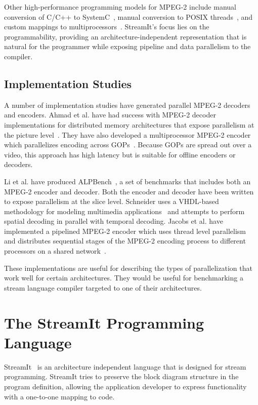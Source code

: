 Other high-performance programming models for MPEG-2 include manual
conversion of C/C++ to SystemC~\cite{pazos04soc}, manual conversion to
POSIX threads~\cite{li05alpbench}, and custom mappings to
multiprocessors~\cite{ahmadmpeg2encoder3, iwata98coarse}.
StreamIt's focus lies on the programmability, providing an
architecture-independent representation that is natural for the
programmer while exposing pipeline and data parallelism to the
compiler.

\section{Implementation Studies}

A number of implementation studies have generated
parallel MPEG-2 decoders and encoders. Ahmad et al. have had
success with MPEG-2 decoder implementations for distributed 
memory architectures that expose parallelism at the
picture level~\cite{ahmadmpeg2encoder, ahmadmpeg2encoder2}. 
They have also developed a multiprocessor MPEG-2 encoder
which parallelizes encoding across GOPs~\cite{ahmadmpeg2encoder3}. 
Because GOPs are spread out over a video, this approach 
has high latency but is suitable for offline encoders or decoders.

Li et al. have produced ALPBench~\cite{li05alpbench}, a set of benchmarks 
that includes both an MPEG-2 encoder and decoder. Both the encoder
and decoder have been written to expose parallelism at the slice level. 
Schneider uses a VHDL-based methodology for modeling multimedia 
applications~\cite{schneider99spec} and attempts to perform spatial 
decoding in parallel with temporal decoding. 
Jacobs et al. have implemented a
pipelined MPEG-2 encoder which uses thread level parallelism and
distributes sequential stages of the MPEG-2 encoding process to 
different processors on a shared network~\cite{jacobs2005mpeg}.

These implementations are useful for describing the types of 
parallelization that work well for certain architectures.
They would be useful for benchmarking a stream language 
compiler targeted to one of their architectures.

\chapter{The StreamIt Programming Language}
\label{chapter:streamit}

StreamIt~\cite{streamitcc} is an architecture independent language
that is designed for stream programming. 
StreamIt tries to preserve the block diagram structure
in the program definition,
allowing the application
developer to express functionality with a one-to-one mapping to code.

